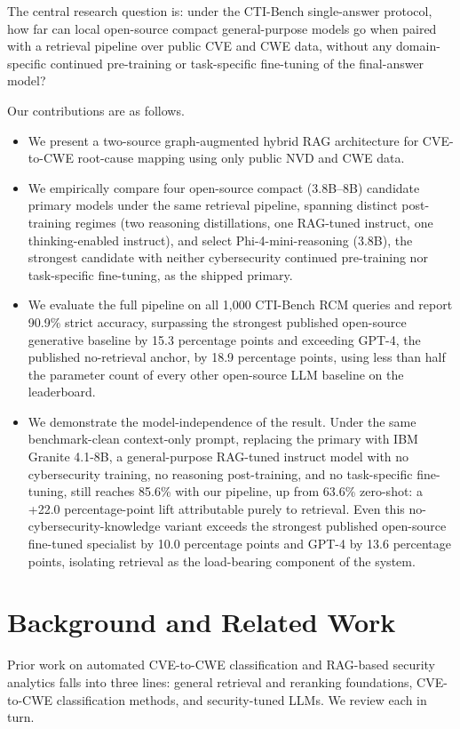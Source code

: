 The central research question is: under the CTI-Bench single-answer protocol, how far can local open-source compact general-purpose models go when paired with a retrieval pipeline over public CVE and CWE data, without any domain-specific continued pre-training or task-specific fine-tuning of the final-answer model?

Our contributions are as follows.
\begin{itemize}
\item We present a two-source graph-augmented hybrid RAG architecture for CVE-to-CWE root-cause mapping using only public NVD and CWE data.
\item We empirically compare four open-source compact (3.8B--8B) candidate primary models under the same retrieval pipeline, spanning distinct post-training regimes (two reasoning distillations, one RAG-tuned instruct, one thinking-enabled instruct), and select Phi-4-mini-reasoning (3.8B), the strongest candidate with neither cybersecurity continued pre-training nor task-specific fine-tuning, as the shipped primary.
\item We evaluate the full pipeline on all 1{,}000 CTI-Bench RCM queries and report 90.9\% strict accuracy, surpassing the strongest published open-source generative baseline by 15.3 percentage points and exceeding GPT-4, the published no-retrieval anchor, by 18.9 percentage points, using less than half the parameter count of every other open-source LLM baseline on the leaderboard.
\item We demonstrate the model-independence of the result. Under the same benchmark-clean context-only prompt, replacing the primary with IBM Granite 4.1-8B, a general-purpose RAG-tuned instruct model with no cybersecurity training, no reasoning post-training, and no task-specific fine-tuning, still reaches 85.6\% with our pipeline, up from 63.6\% zero-shot: a +22.0 percentage-point lift attributable purely to retrieval. Even this no-cybersecurity-knowledge variant exceeds the strongest published open-source fine-tuned specialist by 10.0 percentage points and GPT-4 by 13.6 percentage points, isolating retrieval as the load-bearing component of the system.
\end{itemize}

\section{Background and Related Work}

Prior work on automated CVE-to-CWE classification and RAG-based security analytics falls into three lines: general retrieval and reranking foundations, CVE-to-CWE classification methods, and security-tuned LLMs. We review each in turn.

